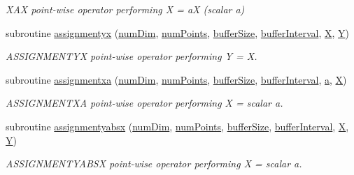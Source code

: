 \begin{DoxyCompactItemize}
\begin{DoxyCompactList}\small\item\em X\+AX point-\/wise operator performing X = aX (scalar a) \end{DoxyCompactList}\item 
subroutine \hyperlink{namespacesimple_add60911ad92b480355ff35648750c006}{assignmentyx} (\hyperlink{SATKernels_8H_a680185db8546de161968dabace9e94f1}{num\+Dim}, \hyperlink{ViscidKernels_8H_adf0bf75d0875d1bb42a5348bee7b7bfd}{num\+Points}, \hyperlink{SpecialKernels_8H_aa9426cdf16e85054db35e88f9b68c6be}{buffer\+Size}, \hyperlink{WENOKernels_8H_ad1001168d5432b52e6d0636f4dc0e60c}{buffer\+Interval}, \hyperlink{SimpleKernels_8H_a1d2fc0c1bfd9fbd97521ac2a8082cd60}{X}, \hyperlink{SimpleKernels_8H_a4731ec58a5102a3b2d3116eaff33f108}{Y})
\begin{DoxyCompactList}\small\item\em A\+S\+S\+I\+G\+N\+M\+E\+N\+T\+YX point-\/wise operator performing Y = X. \end{DoxyCompactList}\item 
subroutine \hyperlink{namespacesimple_a82c25cd0c1d999c2c6028a3bdce656a0}{assignmentxa} (\hyperlink{SATKernels_8H_a680185db8546de161968dabace9e94f1}{num\+Dim}, \hyperlink{ViscidKernels_8H_adf0bf75d0875d1bb42a5348bee7b7bfd}{num\+Points}, \hyperlink{SpecialKernels_8H_aa9426cdf16e85054db35e88f9b68c6be}{buffer\+Size}, \hyperlink{WENOKernels_8H_ad1001168d5432b52e6d0636f4dc0e60c}{buffer\+Interval}, \hyperlink{SimpleKernels_8H_a80f0b648bfd720a2277538fbad1d1eca}{a}, \hyperlink{SimpleKernels_8H_a1d2fc0c1bfd9fbd97521ac2a8082cd60}{X})
\begin{DoxyCompactList}\small\item\em A\+S\+S\+I\+G\+N\+M\+E\+N\+T\+XA point-\/wise operator performing X = scalar a. \end{DoxyCompactList}\item 
subroutine \hyperlink{namespacesimple_ad0ea6bd7b10922952850fd3704ce06cb}{assignmentyabsx} (\hyperlink{SATKernels_8H_a680185db8546de161968dabace9e94f1}{num\+Dim}, \hyperlink{ViscidKernels_8H_adf0bf75d0875d1bb42a5348bee7b7bfd}{num\+Points}, \hyperlink{SpecialKernels_8H_aa9426cdf16e85054db35e88f9b68c6be}{buffer\+Size}, \hyperlink{WENOKernels_8H_ad1001168d5432b52e6d0636f4dc0e60c}{buffer\+Interval}, \hyperlink{SimpleKernels_8H_a1d2fc0c1bfd9fbd97521ac2a8082cd60}{X}, \hyperlink{SimpleKernels_8H_a4731ec58a5102a3b2d3116eaff33f108}{Y})
\begin{DoxyCompactList}\small\item\em A\+S\+S\+I\+G\+N\+M\+E\+N\+T\+Y\+A\+B\+SX point-\/wise operator performing X = scalar a. \end{DoxyCompactList}\item 

\end{DoxyCompactItemize}

